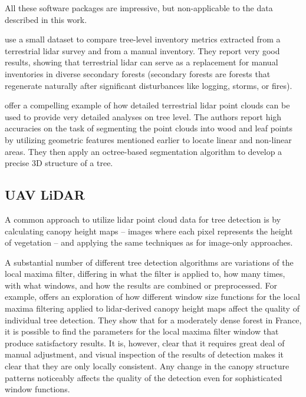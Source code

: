 All these software packages are impressive, but non-applicable to the data described in this work.

\citet{vianaTimberVolumeEstimation2022} use a small dataset to compare tree-level inventory metrics extracted from a terrestrial \gls{lidar} survey and from a manual inventory.
They report very good results, showing that terrestrial \gls{lidar} can serve as a replacement for manual inventories in diverse secondary forests (secondary forests are forests that regenerate naturally after significant disturbances like logging, storms, or fires).

\citet{nurunnabiDevelopmentPreciseTree2024} offer a compelling example of how detailed terrestrial \gls{lidar} point clouds can be used to provide very detailed analyses on tree level.
The authors report high accuracies on the task of segmenting the point clouds into wood and leaf points by utilizing geometric features mentioned earlier to locate linear and non-linear areas.
They then apply an octree-based segmentation algorithm to develop a precise 3D structure of a tree.

\subsection{UAV LiDAR}

A common approach to utilize \gls{lidar} point cloud data for tree detection is by calculating canopy height maps – images where each pixel represents the height of vegetation – and applying the same techniques as for image-only approaches.

A substantial number of different tree detection algorithms are variations of the local maxima filter, differing in what the filter is applied to, how many times, with what windows, and how the results are combined or preprocessed.
For example, \citet{doussExtractionIndividualTrees2022} offers an exploration of how different window size functions for the local maxima filtering applied to \gls{lidar}-derived canopy height maps affect the quality of individual tree detection.
They show that for a moderately dense forest in France, it is possible to find the parameters for the local maxima filter window that produce satisfactory results.
It is, however, clear that it requires great deal of manual adjustment, and visual inspection of the results of detection makes it clear that they are only locally consistent.
Any change in the canopy structure patterns noticeably affects the quality of the detection even for sophisticated window functions.

